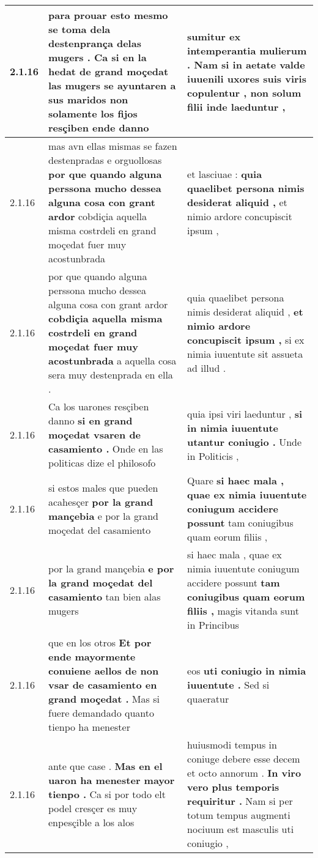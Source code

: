 \begin{tabular}{|p{1cm}|p{6.5cm}|p{6.5cm}|}
2.1.16 & para prouar esto mesmo se toma dela destenprança delas mugers . \textbf{ Ca si en la hedat de grand moçedat las mugers se ayuntaren a sus maridos } non solamente los fijos resçiben ende danno & sumitur ex intemperantia mulierum . \textbf{ Nam si in aetate valde iuuenili uxores suis viris copulentur , } non solum filii inde laeduntur , \\\hline
2.1.16 & mas avn ellas mismas se fazen destenpradas e orguollosas \textbf{ por que quando alguna perssona mucho dessea alguna cosa con grant ardor } cobdiçia aquella misma costrdeli en grand moçedat fuer muy acostunbrada & et lasciuae : \textbf{ quia quaelibet persona nimis desiderat aliquid , } et nimio ardore concupiscit ipsum , \\\hline
2.1.16 & por que quando alguna perssona mucho dessea alguna cosa con grant ardor \textbf{ cobdiçia aquella misma costrdeli en grand moçedat fuer muy acostunbrada } a aquella cosa sera muy destenprada en ella . & quia quaelibet persona nimis desiderat aliquid , \textbf{ et nimio ardore concupiscit ipsum , } si ex nimia iuuentute sit assueta ad illud . \\\hline
2.1.16 & Ca los uarones resçiben danno \textbf{ si en grand moçedat vsaren de casamiento . } Onde en las politicas dize el philosofo & quia ipsi viri laeduntur , \textbf{ si in nimia iuuentute utantur coniugio . } Unde in Politicis , \\\hline
2.1.16 & si estos males que pueden acahesçer \textbf{ por la grand mançebia } e por la grand moçedat del casamiento & Quare \textbf{ si haec mala , quae ex nimia iuuentute coniugum accidere possunt } tam coniugibus quam eorum filiis , \\\hline
2.1.16 & por la grand mançebia \textbf{ e por la grand moçedat del casamiento } tan bien alas mugers & si haec mala , quae ex nimia iuuentute coniugum accidere possunt \textbf{ tam coniugibus quam eorum filiis , } magis vitanda sunt in Princibus \\\hline
2.1.16 & que en los otros \textbf{ Et por ende mayormente conuiene aellos de non vsar de casamiento en grand moçedat . } Mas si fuere demandado quanto tienpo ha menester & eos \textbf{ uti coniugio in nimia iuuentute . } Sed si quaeratur \\\hline
2.1.16 & ante que case . \textbf{ Mas en el uaron ha menester mayor tienpo . } Ca si por todo elt podel cresçer es muy enpesçible a los alos & huiusmodi tempus in coniuge debere esse decem et octo annorum . \textbf{ In viro vero plus temporis requiritur . } Nam si per totum tempus augmenti nociuum est masculis uti coniugio , \\\hline

\end{tabular}
